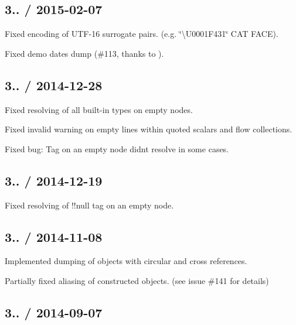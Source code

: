 \subsection*{3.. / 2015-\/02-\/07 }


\begin{DoxyItemize}
\item Fixed encoding of U\+T\+F-\/16 surrogate pairs. (e.\+g. \char`\"{}\textbackslash{}\+U0001\+F431\char`\"{} C\+AT F\+A\+CE).
\item Fixed demo dates dump (\#113, thanks to ).
\end{DoxyItemize}

\subsection*{3.. / 2014-\/12-\/28 }


\begin{DoxyItemize}
\item Fixed resolving of all built-\/in types on empty nodes.
\item Fixed invalid warning on empty lines within quoted scalars and flow collections.
\item Fixed bug\+: Tag on an empty node didn\textquotesingle{}t resolve in some cases.
\end{DoxyItemize}

\subsection*{3.. / 2014-\/12-\/19 }


\begin{DoxyItemize}
\item Fixed resolving of !!null tag on an empty node.
\end{DoxyItemize}

\subsection*{3.. / 2014-\/11-\/08 }


\begin{DoxyItemize}
\item Implemented dumping of objects with circular and cross references.
\item Partially fixed aliasing of constructed objects. (see issue \#141 for details)
\end{DoxyItemize}

\subsection*{3.. / 2014-\/09-\/07 }


